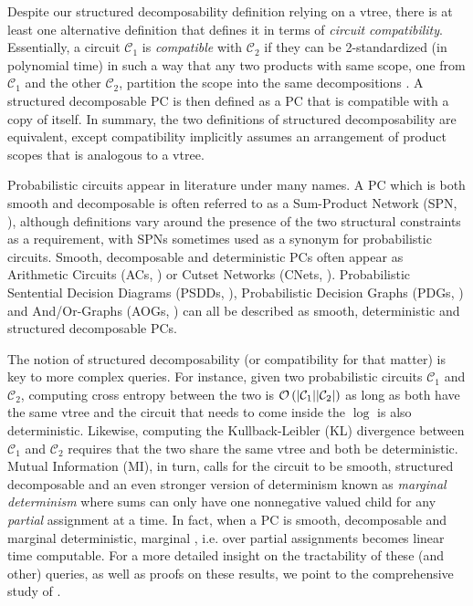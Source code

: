 Despite our structured decomposability definition relying on a vtree, there is at least one
alternative definition that defines it in terms of \emph{circuit compatibility}. Essentially, a
circuit $\mathcal{C}_1$ is \emph{compatible} with $\mathcal{C}_2$ if they can be 2-standardized (in
polynomial time) in such a way that any two products with same scope, one from $\mathcal{C}_1$ and
the other $\mathcal{C}_2$, partition the scope into the same decompositions \citep{vergari21}. A
structured decomposable PC is then defined as a PC that is compatible with a copy of itself. In
summary, the two definitions of structured decomposability are equivalent, except compatibility
implicitly assumes an arrangement of product scopes that is analogous to a vtree.

Probabilistic circuits appear in literature under many names. A PC which is both smooth and
decomposable is often referred to as a Sum-Product Network (SPN, \cite{poon11}), although
definitions vary around the presence of the two structural constraints as a requirement, with SPNs
sometimes used as a synonym for probabilistic circuits. Smooth, decomposable and deterministic PCs
often appear as Arithmetic Circuits (ACs, \cite{darwiche03}) or Cutset Networks (CNets,
\cite{rahman14}). Probabilistic Sentential Decision Diagrams (PSDDs, \cite{kisa14}), Probabilistic
Decision Graphs (PDGs, \cite{jaeger04}) and And/Or-Graphs (AOGs, \cite{dechter07}) can all be
described as smooth, deterministic and structured decomposable PCs.

The notion of structured decomposability (or compatibility for that matter) is key to more complex
queries. For instance, given two probabilistic circuits $\mathcal{C}_1$ and $\mathcal{C}_2$,
computing cross entropy between the two is $\mathcal{O}\left(|\mathcal{C}_1||\mathcal{C}_2|\right)$ as
long as both have the same vtree and the circuit that needs to come inside the $\log$ is also
deterministic. Likewise, computing the Kullback-Leibler (KL) divergence between $\mathcal{C}_1$ and
$\mathcal{C}_2$ requires that the two share the same vtree and both be deterministic. Mutual
Information (MI), in turn, calls for the circuit to be smooth, structured decomposable and an even
stronger version of determinism known as \emph{marginal determinism} where sums can only have one
nonnegative valued child for any \emph{partial} assignment at a time. In fact, when a PC is smooth,
decomposable and marginal deterministic, marginal \map{}, i.e. \map{} over partial assignments
becomes linear time computable. For a more detailed insight on the tractability of these (and
other) queries, as well as proofs on these results, we point to the comprehensive study of
\citet{vergari21}.

